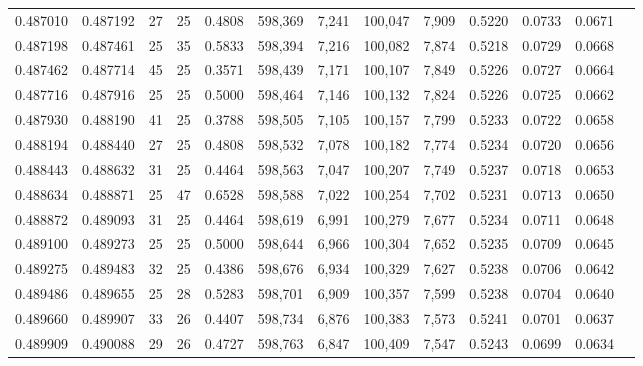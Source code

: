 \begin{tabular}{rrrrrrrrrrrrr}
0.487010 & 0.487192 &    27 &  25 &                                     0.4808 & 598,369 &   7,241 & 100,047 &   7,909 & 0.5220 & 0.0733 & 0.0671 \\
0.487198 & 0.487461 &    25 &  35 &                                     0.5833 & 598,394 &   7,216 & 100,082 &   7,874 & 0.5218 & 0.0729 & 0.0668 \\
0.487462 & 0.487714 &    45 &  25 &                                     0.3571 & 598,439 &   7,171 & 100,107 &   7,849 & 0.5226 & 0.0727 & 0.0664 \\
0.487716 & 0.487916 &    25 &  25 &                                     0.5000 & 598,464 &   7,146 & 100,132 &   7,824 & 0.5226 & 0.0725 & 0.0662 \\
0.487930 & 0.488190 &    41 &  25 &                                     0.3788 & 598,505 &   7,105 & 100,157 &   7,799 & 0.5233 & 0.0722 & 0.0658 \\
0.488194 & 0.488440 &    27 &  25 &                                     0.4808 & 598,532 &   7,078 & 100,182 &   7,774 & 0.5234 & 0.0720 & 0.0656 \\
0.488443 & 0.488632 &    31 &  25 &                                     0.4464 & 598,563 &   7,047 & 100,207 &   7,749 & 0.5237 & 0.0718 & 0.0653 \\
0.488634 & 0.488871 &    25 &  47 &                                     0.6528 & 598,588 &   7,022 & 100,254 &   7,702 & 0.5231 & 0.0713 & 0.0650 \\
0.488872 & 0.489093 &    31 &  25 &                                     0.4464 & 598,619 &   6,991 & 100,279 &   7,677 & 0.5234 & 0.0711 & 0.0648 \\
0.489100 & 0.489273 &    25 &  25 &                                     0.5000 & 598,644 &   6,966 & 100,304 &   7,652 & 0.5235 & 0.0709 & 0.0645 \\
0.489275 & 0.489483 &    32 &  25 &                                     0.4386 & 598,676 &   6,934 & 100,329 &   7,627 & 0.5238 & 0.0706 & 0.0642 \\
0.489486 & 0.489655 &    25 &  28 &                                     0.5283 & 598,701 &   6,909 & 100,357 &   7,599 & 0.5238 & 0.0704 & 0.0640 \\
0.489660 & 0.489907 &    33 &  26 &                                     0.4407 & 598,734 &   6,876 & 100,383 &   7,573 & 0.5241 & 0.0701 & 0.0637 \\
0.489909 & 0.490088 &    29 &  26 &                                     0.4727 & 598,763 &   6,847 & 100,409 &   7,547 & 0.5243 & 0.0699 & 0.0634 \\

\end{tabular}
